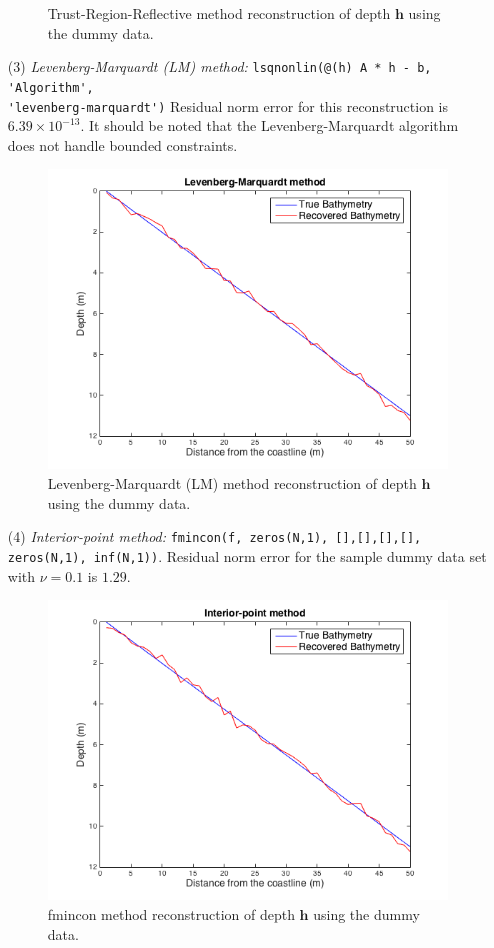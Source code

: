 \begin{itemize}
\begin{figure}[H]
\caption{Trust-Region-Reflective method reconstruction of depth $\mathbf{h}$ using the dummy data.}
\label{trust_region_fig}
\end{figure}
\item[(3)]  \textit{Levenberg-Marquardt (LM) method:}  
\verb|lsqnonlin(@(h) A * h - b, 'Algorithm',| \\ \verb|'levenberg-marquardt')|
Residual norm error for this reconstruction is $6.39 \times 10^{-13}$. It should be noted that the Levenberg-Marquardt algorithm does not handle bounded constraints. 
\begin{figure}[H]
\center
\includegraphics[scale=0.6]{img/LM_linear.png} 
\caption{Levenberg-Marquardt (LM) method reconstruction of depth $\mathbf{h}$ using the dummy data.}
\label{LM_fig}
\end{figure}
\item[(4)]  \textit{Interior-point method:} \verb|fmincon(f, zeros(N,1), [],[],[],[], zeros(N,1), inf(N,1))|. Residual norm error for the sample dummy data set  with $\nu = 0.1$ is $1.29$. 
\begin{figure}[H]
\center
\includegraphics[scale=0.6]{img/fmincon_linear.png} 
\caption{fmincon method reconstruction of depth $\mathbf{h}$ using the dummy data.}
\label{LM_fig}
\end{figure}
\end{itemize}



